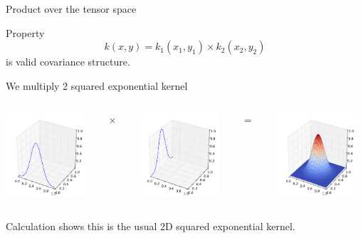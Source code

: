 \begin{frame}{Product over the tensor space}
\begin{block}{Property}
\begin{equation*}
k(x,y) = k_1(x_1,y_1) \times k_2(x_2,y_2)
\end{equation*}
is valid covariance structure.
\end{block}
\begin{example}
We multiply 2 squared exponential kernel
\begin{columns}[c]
\begin{column}{3cm}
\includegraphics[width=3cm]{3_gaussian_process_regression/figures/python/newfromold-sum2-k1}
\end{column}
\begin{column}{2mm}
$\times $
\end{column}
\begin{column}{3cm}
\includegraphics[width=3cm]{3_gaussian_process_regression/figures/python/newfromold-sum2-k2}
\end{column}
\begin{column}{2mm}
$=$
\end{column}
\begin{column}{3cm}
\includegraphics[width=3cm]{3_gaussian_process_regression/figures/python/newfromold-prod2-k12}
\end{column}
\end{columns}
\vspace{5mm}
Calculation shows this is the usual 2D squared exponential kernel.
\end{example}
\end{frame}

